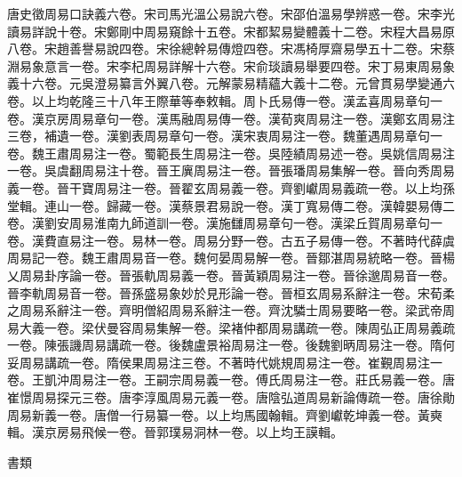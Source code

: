 \begin{pinyinscope}
唐史徵周易口訣義六卷。宋司馬光溫公易說六卷。宋邵伯溫易學辨惑一卷。宋李光讀易詳說十卷。宋鄭剛中周易窺餘十五卷。宋都絜易變體義十二卷。宋程大昌易原八卷。宋趙善譽易說四卷。宋徐總幹易傳燈四卷。宋馮椅厚齋易學五十二卷。宋蔡淵易象意言一卷。宋李杞周易詳解十六卷。宋俞琰讀易舉要四卷。宋丁易東周易象義十六卷。元吳澄易纂言外翼八卷。元解蒙易精蘊大義十二卷。元曾貫易學變通六卷。以上均乾隆三十八年王際華等奉敕輯。周卜氏易傳一卷。漢孟喜周易章句一卷。漢京房周易章句一卷。漢馬融周易傳一卷。漢荀爽周易注一卷。漢鄭玄周易注三卷，補遺一卷。漢劉表周易章句一卷。漢宋衷周易注一卷。魏董遇周易章句一卷。魏王肅周易注一卷。蜀範長生周易注一卷。吳陸績周易述一卷。吳姚信周易注一卷。吳虞翻周易注十卷。晉王廙周易注一卷。晉張璠周易集解一卷。晉向秀周易義一卷。晉干寶周易注一卷。晉翟玄周易義一卷。齊劉巘周易義疏一卷。以上均孫堂輯。連山一卷。歸藏一卷。漢蔡景君易說一卷。漢丁寬易傳二卷。漢韓嬰易傳二卷。漢劉安周易淮南九師道訓一卷。漢施讎周易章句一卷。漢梁丘賀周易章句一卷。漢費直易注一卷。易林一卷。周易分野一卷。古五子易傳一卷。不著時代薛虞周易記一卷。魏王肅周易音一卷。魏何晏周易解一卷。晉鄒湛周易統略一卷。晉楊乂周易卦序論一卷。晉張軌周易義一卷。晉黃穎周易注一卷。晉徐邈周易音一卷。晉李軌周易音一卷。晉孫盛易象妙於見形論一卷。晉桓玄周易系辭注一卷。宋荀柔之周易系辭注一卷。齊明僧紹周易系辭注一卷。齊沈驎士周易要略一卷。梁武帝周易大義一卷。梁伏曼容周易集解一卷。梁褚仲都周易講疏一卷。陳周弘正周易義疏一卷。陳張譏周易講疏一卷。後魏盧景裕周易注一卷。後魏劉昞周易注一卷。隋何妥周易講疏一卷。隋侯果周易注三卷。不著時代姚規周易注一卷。崔覲周易注一卷。王凱沖周易注一卷。王嗣宗周易義一卷。傅氏周易注一卷。莊氏易義一卷。唐崔憬周易探元三卷。唐李淳風周易元義一卷。唐陰弘道周易新論傳疏一卷。唐徐勛周易新義一卷。唐僧一行易纂一卷。以上均馬國翰輯。齊劉巘乾坤義一卷。黃奭輯。漢京房易飛候一卷。晉郭璞易洞林一卷。以上均王謨輯。

書類


\end{pinyinscope}
